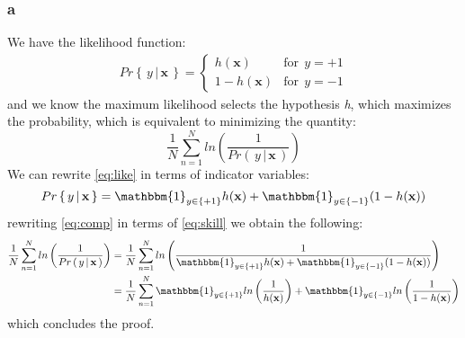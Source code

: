 \documentclass{article}
\begin{document}
\subsubsection{a}
We have the likelihood function:
\begin{align}
\label{eq:like}
Pr\left\{ \, y \, | \, \mathbf{x} \, \right\} =
\begin{cases} 
      h(\mathbf{x}) & \text{for} \;\, y=+1 \\
      1-h(\mathbf{x}) & \text{for} \;\, y=-1
   \end{cases}
\end{align}
and we know the maximum likelihood selects the hypothesis \textit{h}, which maximizes the probability, which is equivalent to minimizing the quantity:
\begin{equation}
\dfrac{1}{N} \sum\limits_{n=1}^N ln \left( \dfrac{1}{Pr\left( \, y \, | \, \mathbf{x} \, \right)} \right)
\label{eq:comp}
\end{equation}
We can rewrite \eqref{eq:like} in terms of indicator variables:
\begin{equation}
Pr\left\{ \, y \, | \, \mathbf{x} \, \right\} = \mathbbm{1}_{y \in \left\{ +1 \right\}}h(\mathbf{x}) + \mathbbm{1}_{y \in \left\{ -1 \right\}}(1-h(\mathbf{x}))
\label{eq:skill}
\end{equation}
rewriting \eqref{eq:comp} in terms of \eqref{eq:skill} we obtain the following:
\begin{align}
\dfrac{1}{N} \sum\limits_{n=1}^N ln \left( \dfrac{1}{Pr\left( \, y \, | \, \mathbf{x} \, \right)} \right) &=
\dfrac{1}{N} \sum\limits_{n=1}^N ln \left(\dfrac{1}{\mathbbm{1}_{y \in \left\{ +1 \right\}}h(\mathbf{x}) + \mathbbm{1}_{y \in \left\{ -1 \right\}}(1-h(\mathbf{x}))} \right) \\
&= 
\dfrac{1}{N} \sum\limits_{n=1}^N  \mathbbm{1}_{y \in \left\{ +1 \right\}} ln \left(\dfrac{1}{h(\mathbf{x})}\right) + \mathbbm{1}_{y \in \left\{ -1 \right\}} ln \left(\dfrac{1}{1-h(\mathbf{x})} \right)
\label{eq:hello}
\end{align}
which concludes the proof.
\end{document}

